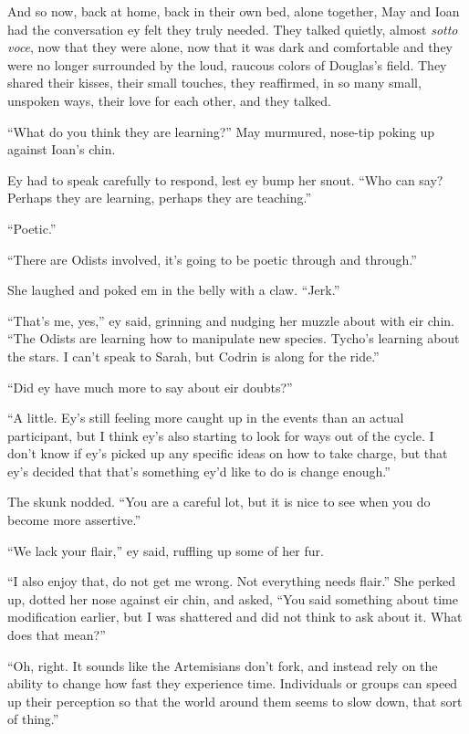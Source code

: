 And so now, back at home, back in their own bed, alone together, May and Ioan had the conversation ey felt they truly needed. They talked quietly, almost \emph{sotto voce}, now that they were alone, now that it was dark and comfortable and they were no longer surrounded by the loud, raucous colors of Douglas's field. They shared their kisses, their small touches, they reaffirmed, in so many small, unspoken ways, their love for each other, and they talked.

``What do you think they are learning?'' May murmured, nose-tip poking up against Ioan's chin.

Ey had to speak carefully to respond, lest ey bump her snout. ``Who can say? Perhaps they are learning, perhaps they are teaching.''

``Poetic.''

``There are Odists involved, it's going to be poetic through and through.''

She laughed and poked em in the belly with a claw. ``Jerk.''

``That's me, yes,'' ey said, grinning and nudging her muzzle about with eir chin. ``The Odists are learning how to manipulate new species. Tycho's learning about the stars. I can't speak to Sarah, but Codrin is along for the ride.''

``Did ey have much more to say about eir doubts?''

``A little. Ey's still feeling more caught up in the events than an actual participant, but I think ey's also starting to look for ways out of the cycle. I don't know if ey's picked up any specific ideas on how to take charge, but that ey's decided that that's something ey'd like to do is change enough.''

The skunk nodded. ``You are a careful lot, but it is nice to see when you do become more assertive.''

``We lack your flair,'' ey said, ruffling up some of her fur.

``I also enjoy that, do not get me wrong. Not everything needs flair.'' She perked up, dotted her nose against eir chin, and asked, ``You said something about time modification earlier, but I was shattered and did not think to ask about it. What does that mean?''

``Oh, right. It sounds like the Artemisians don't fork, and instead rely on the ability to change how fast they experience time. Individuals or groups can speed up their perception so that the world around them seems to slow down, that sort of thing.''

